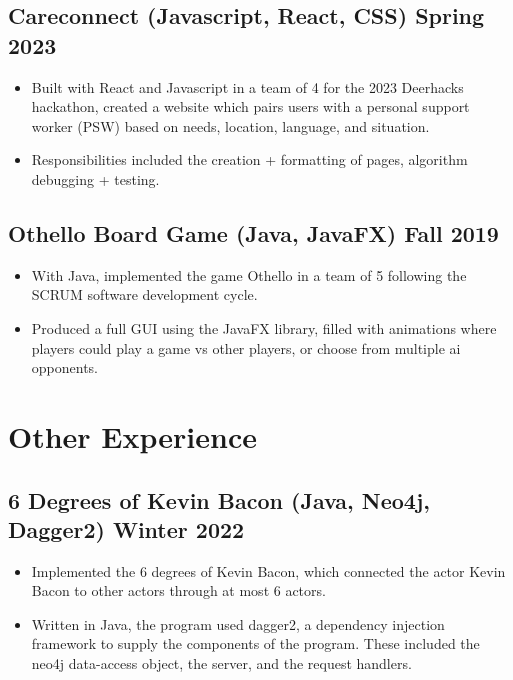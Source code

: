 \documentclass[10pt]{article}
\begin{document}
\subsection{Careconnect (Javascript, React, CSS) \hfill Spring 2023}
\begin{itemize}
  \item Built with React and Javascript in a team of 4 for the 2023 Deerhacks hackathon, created a website which pairs users with a personal support worker (PSW) based on needs, location, language, and situation.
  \item Responsibilities included the creation + formatting of pages, algorithm debugging + testing.
\end{itemize}

\subsection{Othello Board Game (Java, JavaFX) \hfill Fall 2019}
\begin{itemize}
  \item With Java, implemented the game Othello in a team of 5 following the SCRUM software development cycle.
  \item Produced a full GUI using the JavaFX library, filled with animations where players could play a game vs other players, or choose from multiple ai opponents.
\end{itemize}

\section{Other Experience}
\subsection{6 Degrees of Kevin Bacon (Java, Neo4j, Dagger2) \hfill Winter 2022}
\begin{itemize}
  \item Implemented the 6 degrees of Kevin Bacon, which connected the actor Kevin Bacon to other actors through at most 6 actors.
  \item Written in Java, the program used dagger2, a dependency injection framework to supply the components of the program. These included the neo4j
        data-access object, the server, and the request handlers.
\end{itemize}
\end{document}
